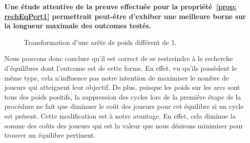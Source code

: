 \textbf{Une étude attentive de la preuve effectuée pour \linebreak la propriété~\ref{prop: rechEqPert1} permettrait peut-être d'exhiber une meilleure bor\-ne sur la longueur maximale des outcomes testés.}

\begin{figure}[!h]
	\centering
	\caption{Transformation d'une arête de poids différent de 1.}
	\label{fig:transfoGraphPoids}
\end{figure}

Nous pouvons donc conclure qu'il est correct de se restreindre à le recherche d'équilibres dont l'outcome est de cette forme. En effet, vu qu'ils possèdent le même type, cela n'influence pas notre intention de maximiser le nombre de joueurs qui atteignent leur objectif. De plus, puisque les poids sur les arcs sont tous des poids positifs, la suppression des cycles lors de la première étape de la procédure ne fait que diminuer le coût des joueurs pour cet équilibre si un cycle est présent. Cette modification est à notre avantage. En effet, cela diminue la somme des coûts des joueurs qui est la valeur que nous désirons minimiser pour trouver un équilibre pertinent.\\

